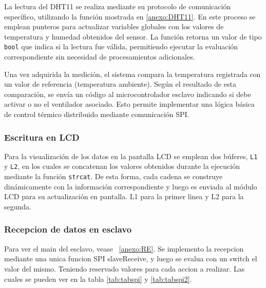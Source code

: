 La lectura del DHT11 se realiza mediante su protocolo de comunicación específico, utilizando la función mostrada en \ref{anexo:DHT11}. En este proceso se emplean punteros para actualizar variables globales con los valores de temperatura y humedad obtenidos del sensor. La función retorna un valor de tipo \texttt{bool} que indica si la lectura fue válida, permitiendo ejecutar la evaluación correspondiente sin necesidad de procesamientos adicionales.

\vspace{1em}

Una vez adquirida la medición, el sistema compara la temperatura registrada con un valor de referencia (temperatura ambiente). Según el resultado de esta comparación, se envía un código al microcontrolador esclavo indicando si debe activar o no el ventilador asociado. Esto permite implementar una lógica básica de control térmico distribuido mediante comunicación SPI.

\vspace{1em}
\subsubsection{\textbf{Escritura en LCD}}

Para la visualización de los datos en la pantalla LCD se emplean dos búferes, \texttt{L1} y \texttt{L2}, en los cuales se concatenan los valores obtenidos durante la ejecución mediante la función \texttt{strcat}. De esta forma, cada cadena se construye dinámicamente con la información correspondiente y luego es enviada al módulo LCD para su actualización en pantalla. L1 para la primer linea y L2 para la segunda.

\vspace{1em}
\subsubsection{\textbf{Recepcion de datos en esclavo}}

Para ver el main del esclavo, vease ~\ref{anexo:RE}. Se implemento la recepcion mediante una unica funcion SPI slaveReceive, y luego se evalua con un switch el valor del mismo. Teniendo reservado valores para cada accion a realizar. Las cuales se pueden ver en la tabla \ref{tab:tabspi} y \ref{tab:tabspi2}.


